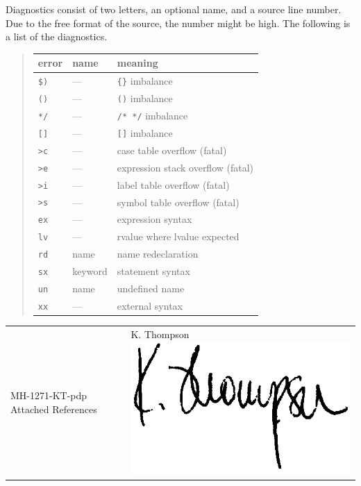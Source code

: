\documentclass[12pt]{report}
\begin{document}
Diagnostics consist of two letters, an optional name, and a source
line number. Due to the free format of the source, the number might be
high. The following is a list of the diagnostics.
\begin{quote}
  \begin{tabular}{lll}
    \toprule
    error & name & meaning \\
    \midrule
    \verb|$)| & --- & \verb|{}| imbalance \\
    \verb|()| & --- & \verb|()| imbalance \\
    \verb|*/| & --- & \verb|/* */| imbalance \\
    \verb|[]| &	--- & \verb|[]| imbalance \\
    \verb|>c| & --- & case table overflow (fatal) \\
    \verb|>e| & --- & expression stack overflow (fatal) \\
    \verb|>i| & --- & label table overflow (fatal) \\
    \verb|>s| & --- & symbol table overflow (fatal) \\
    \verb|ex| & --- & expression syntax \\
    \verb|lv| & --- & rvalue where lvalue expected \\
    \verb|rd| &	name & name redeclaration \\
    \verb|sx| & keyword & statement syntax \\
    \verb|un| & name & undefined name \\
    \verb|xx| &	--- & external syntax \\
    \bottomrule
  \end{tabular}
\end{quote}

\vspace{1cm}

\begin{tabular}{p{9cm}p{4cm}}
  MH-1271-KT-pdp \newline
  Attached References
  & \raggedright K. Thompson \newline
    \vspace{0cm}
    \includegraphics[scale=0.25]{sig.png}  
\end{tabular}
\end{document}
